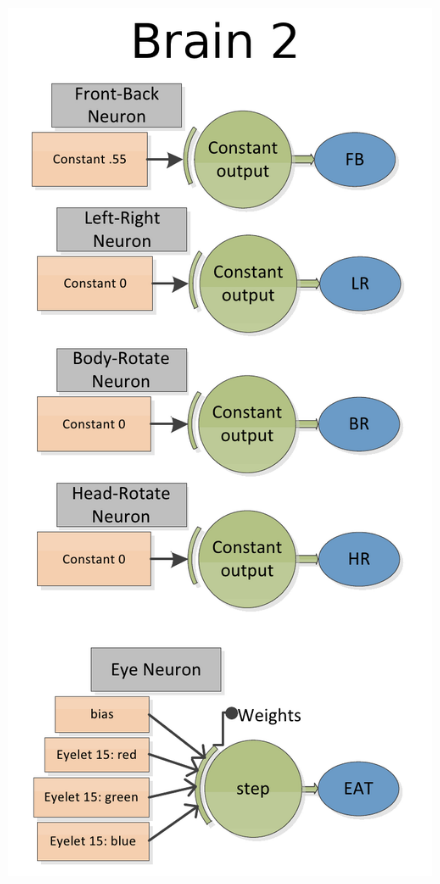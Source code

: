 \begin{figure}
\begin{center}
  \includegraphics[scale=.45]{img/arch2.png}
\end{center}
\end{figure}
